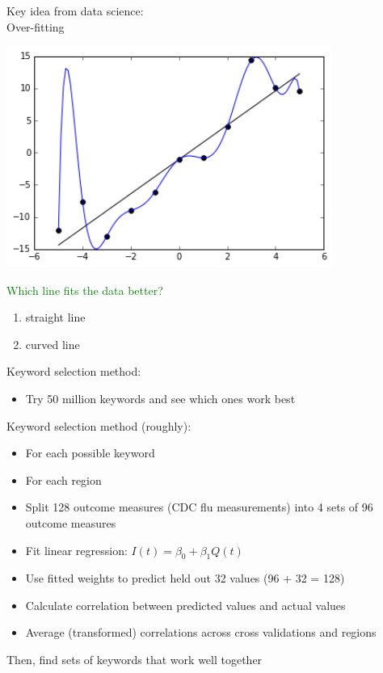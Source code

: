 \documentclass[aspectratio=169]{beamer}
\def\vf{\vfill}
\begin{document}
\begin{frame}

Key idea from data science:\\
Over-fitting

\end{frame}
\begin{frame}

\begin{center}
\includegraphics[width=0.8\textwidth]{figures/overfitted_data}
\end{center}

\textcolor{green}{Which line fits the data better?}
\begin{enumerate}
\item straight line
\item curved line
\end{enumerate}

\vf
{}

\end{frame}
\begin{frame}

Keyword selection method:
\begin{itemize}
\item Try 50 million keywords and see which ones work best
\end{itemize}

\end{frame}
\begin{frame}

Keyword selection method (roughly):
\begin{itemize}
\item For each possible keyword
\item For each region
\item Split 128 outcome measures (CDC flu measurements) into 4 sets of 96 outcome measures 
\item Fit linear regression: $I(t) = \beta_0 + \beta_1 Q(t)$
\item Use fitted weights to predict held out 32 values (96 + 32 = 128) 
\item Calculate correlation between predicted values and actual values
\item Average (transformed) correlations across cross validations and regions
\end{itemize}
\vf
Then, find sets of keywords that work well together
\end{frame}
\end{document}
